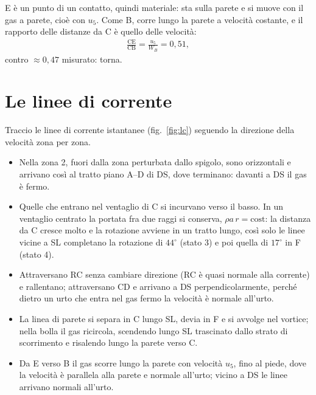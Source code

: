 E è un punto di un contatto, quindi materiale: sta sulla parete e si muove con il gas a parete, cioè con $u_5$. Come B,
corre lungo la parete a velocità costante, e il rapporto delle distanze da C è quello delle velocità:
\begin{gather*}
  \frac{\mathrm{CE}}{\mathrm{CB}}=\frac{u_5}{W_B}=0{,}51 ,
\end{gather*}
contro $\approx0{,}47$ misurato: torna.

\section*{Le linee di corrente}
Traccio le linee di corrente istantanee (fig.~\ref{fig:lc}) seguendo la direzione della velocità zona per zona.
\begin{itemize}
\item Nella zona 2, fuori dalla zona perturbata dallo spigolo, sono orizzontali e arrivano così al tratto piano A--D
  di DS, dove terminano: davanti a DS il gas è fermo.
\item Quelle che entrano nel ventaglio di C si incurvano verso il basso. In un ventaglio centrato la portata fra due
  raggi si conserva, $\rho a\,r=\text{cost}$: la distanza da C cresce molto e la rotazione avviene in un tratto lungo,
  così solo le linee vicine a SL completano la rotazione di $44^\circ$ (stato 3) e poi quella di $17^\circ$ in F
  (stato 4).
\item Attraversano RC senza cambiare direzione (RC è quasi normale alla corrente) e rallentano; attraversano CD e
  arrivano a DS perpendicolarmente, perché dietro un urto che entra nel gas fermo la velocità è normale all'urto.
\item La linea di parete si separa in C lungo SL, devia in F e si avvolge nel vortice; nella bolla il gas ricircola,
  scendendo lungo SL trascinato dallo strato di scorrimento e risalendo lungo la parete verso C.
\item Da E verso B il gas scorre lungo la parete con velocità $u_5$, fino al piede, dove la velocità è parallela alla
  parete e normale all'urto; vicino a DS le linee arrivano normali all'urto.
\end{itemize}



